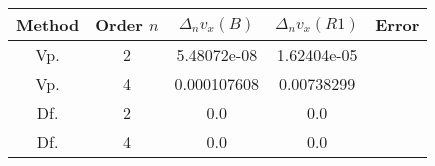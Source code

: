 \begin{tabular}[b]{ccccc}\hline 
 Method & Order $n$&  $\Delta_n v_x(B)$ & $\Delta_n v_x(R1) $& Error \\ \hline
Vp. & 2 & 5.48072e-08 & 1.62404e-05\\  
Vp. & 4 & 0.000107608 & 0.00738299\\  
Df. & 2 & 0.0 & 0.0\\  
Df. & 4 & 0.0 & 0.0\\ \hline  
\end{tabular}
